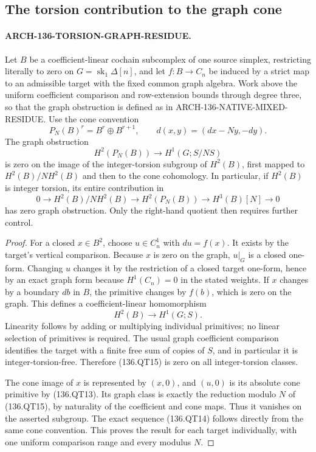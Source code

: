 \subsection{The torsion contribution to the graph cone}

\paragraph{ARCH-136-TORSION-GRAPH-RESIDUE.}
Let \(B\) be a coefficient-linear cochain subcomplex of one
source simplex, restricting literally to zero on
\(G=\operatorname{sk}_1\Delta[n]\), and let \(f:B\to C_n\)
be induced by a strict map to an admissible target with the
fixed common graph algebra.  Work above the uniform coefficient
comparison and row-extension bounds through degree three, so
that the graph obstruction is defined as in
ARCH-136-NATIVE-MIXED-RESIDUE.  Use the cone convention
\[
 P_N(B)^r=B^r\oplus B^{r+1},\qquad
                  d(x,y)=(dx-Ny,-dy).
                                                               \tag{136.QT13}
\]
The graph obstruction
\[
             H^2(P_N(B))\longrightarrow H^1(G;S/NS)
\]
is zero on the image of the integer-torsion subgroup of
\(H^2(B)\), first mapped to \(H^2(B)/NH^2(B)\) and
then to the cone cohomology.  In particular, if \(H^2(B)\) is
integer torsion, its entire contribution in
\[
 0\longrightarrow H^2(B)/NH^2(B)
  \longrightarrow H^2(P_N(B))
  \longrightarrow H^3(B)[N]\longrightarrow0
                                                               \tag{136.QT14}
\]
has zero graph obstruction.  Only the right-hand quotient then
requires further control.

\begin{proof}
For a closed \(x\in B^2\), choose \(u\in C_n^1\) with
\(du=f(x)\).  It exists by the target's vertical comparison.
Because \(x\) is zero on the graph, \(u|_G\) is a closed
one-form.  Changing \(u\) changes it by the restriction of a
closed target one-form, hence by an exact graph form because
\(H^1(C_n)=0\) in the stated weights.  If \(x\) changes
by a boundary \(db\) in \(B\), the primitive changes by
\(f(b)\), which is zero on the graph.  This defines a
coefficient-linear homomorphism
\[
                 H^2(B)\longrightarrow H^1(G;S).
                                                               \tag{136.QT15}
\]
Linearity follows by adding or multiplying individual primitives;
no linear selection of primitives is required.  The usual graph
coefficient comparison identifies the target with a finite
free sum of copies of \(S\), and in particular it is
integer-torsion-free.  Therefore (136.QT15) is zero on all
integer-torsion classes.

The cone image of \(x\) is represented by \((x,0)\), and
\((u,0)\) is its absolute cone primitive by (136.QT13).
Its graph class is exactly the reduction modulo \(N\) of
(136.QT15), by naturality of the coefficient and cone maps.
Thus it vanishes on the asserted subgroup.  The exact sequence
(136.QT14) follows directly from the same cone convention.
This proves the result for each target individually, with
one uniform comparison range and every modulus \(N\).
\end{proof}

